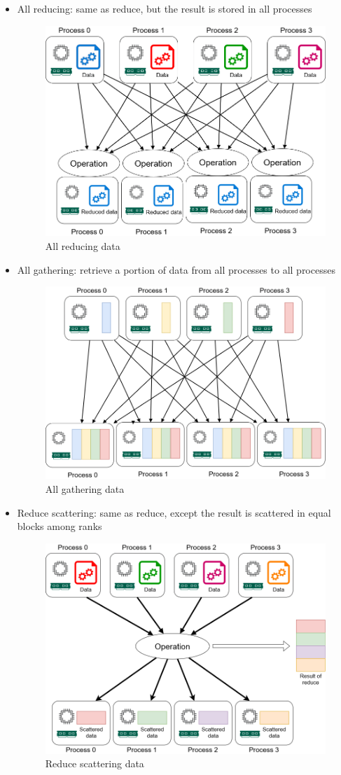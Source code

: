 \documentclass{article}
\begin{document}
\begin{itemize}
  \item All reducing: same as reduce, but the result is stored in all processes
  \begin{figure}[h!]
    \center
    \includegraphics[width=0.65\linewidth]{images/2022-09-05-16-27-58.png}
    \caption{All reducing data}
  \end{figure}
\FloatBarrier
  \item All gathering: retrieve a portion of data from all processes to all processes
  \begin{figure}[h!]
    \center
    \includegraphics[width=0.65\linewidth]{images/2022-09-05-16-42-14.png}
    \caption{All gathering data}
  \end{figure}
  \FloatBarrier
  \item Reduce scattering: same as reduce, except the result is scattered in equal blocks among ranks
  \begin{figure}[h!]
    \center
    \includegraphics[width=0.65\linewidth]{images/2022-09-07-14-42-30.png}
    \caption{Reduce scattering data}
  \end{figure}
  \FloatBarrier
\end{itemize}
\end{document}
